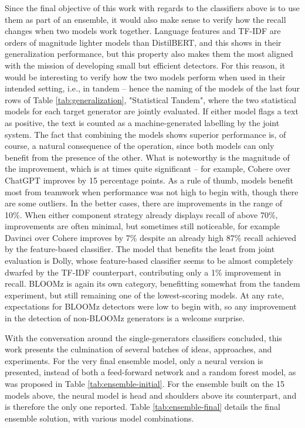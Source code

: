 Since the final objective of this work with regards to the classifiers above is to use them as part of an ensemble, it would also make sense to verify how the recall changes when two models work together.
Language features and TF-IDF are orders of magnitude lighter models than DistilBERT, and this shows in their generalization performance, but this property also makes them the most aligned with the mission of developing small but efficient detectors.
For this reason, it would be interesting to verify how the two models perform when used in their intended setting, i.e., in tandem -- hence the naming of the models of the last four rows of Table \ref{tab:generalization}, "Statistical Tandem", where the two statistical models for each target generator are jointly evaluated.
If either model flags a text as positive, the text is counted as a machine-generated labelling by the joint system.
The fact that combining the models shows superior performance is, of course, a natural consequence of the operation, since both models can only benefit from the presence of the other.
What is noteworthy is the magnitude of the improvement, which is at times quite significant -- for example, Cohere over ChatGPT improves by 15 percentage points.
As a rule of thumb, models benefit most from teamwork when performance was not high to begin with, though there are some outliers.
In the better cases, there are improvements in the range of 10\%.
When either component strategy already displays recall of above 70\%, improvements are often minimal, but sometimes still noticeable, for example Davinci over Cohere improves by 7\% despite an already high 87\% recall achieved by the feature-based classifier.
The model that benefits the least from joint evaluation is Dolly, whose feature-based classifier seems to be almost completely dwarfed by the TF-IDF counterpart, contributing only a 1\% improvement in recall.
BLOOMz is again its own category, benefitting somewhat from the tandem experiment, but still remaining one of the lowest-scoring models.
At any rate, expectations for BLOOMz detectors were low to begin with, so any improvement in the detection of non-BLOOMz generators is a welcome surprise.

With the conversation around the single-generators classifiers concluded, this work presents the culmination of several batches of ideas, approaches, and experiments.
For the very final ensemble model, only a neural version is presented, instead of both a feed-forward network and a random forest model, as was proposed in Table \ref{tab:ensemble-initial}.
For the ensemble built on the 15 models above, the neural model is head and shoulders above its counterpart, and is therefore the only one reported.
Table \ref{tab:ensemble-final} details the final ensemble solution, with various model combinations.


